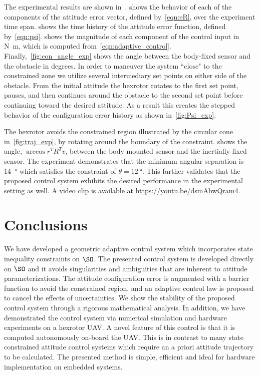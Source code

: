 The experimental results are shown in~.
 shows the behavior of each of the components of the attitude error vector, defined by~\cref{eqn:eR}, over the experiment time span.
 shows the time history of the attitude error function, defined by~\cref{eqn:psi}.
 shows the magnitude of each component of the control input in \si{\newton\meter}, which is computed from~\cref{eqn:adaptive_control}.
Finally,~\cref{fig:con_angle_exp} shows the angle between the body-fixed sensor and the obstacle in degrees.
In order to maneuver the system ``close" to the constrained zone we utilize several intermediary set points on either side of the obstacle.
From the initial attitude the hexrotor rotates to the first set point, pauses, and then continues around the obstacle to the second set point before continuing toward the desired attitude.
As a result this creates the stepped behavior of the configuration error history as shown in~\cref{fig:Psi_exp}.

The hexrotor avoids the constrained region illustrated by the circular cone in~\cref{fig:traj_exp}, by rotating around the boundary of the constraint. 
 shows the angle, \( \arccos r^T R^T v \), between the body mounted sensor and the inertially fixed sensor.
The experiment demonstrates that the minimum angular separation is \SI{14}{\degree} which satisfies the constraint of \( \theta = \SI{12}{\degree} \).
This further validates that the proposed control system exhibits the desired performance in the experimental setting as well. 
A video clip is available at \url{https://youtu.be/dsmAbwQram4}.

\section{Conclusions}\label{sec:conclusions}
We have developed a geometric adaptive control system which incorporates state inequality constraints on \(\SO\).
The presented control system is developed directly on \(\SO\) and it avoids singularities and ambiguities that are inherent to attitude parameterizations.
The attitude configuration error is augmented with a barrier function to avoid the constrained region, and an adaptive control law is proposed to cancel the effects of uncertainties. 
We show the stability of the  proposed control system through a rigorous mathematical analysis.
In addition, we have demonstrated the control system via numerical simulation and hardware experiments on a hexrotor UAV.
A novel feature of this control is that it is computed autonomously on-board the UAV.
This is in contrast to many state constrained attitude control systems which require an a priori attitude trajectory to be calculated. 
The presented method is simple, efficient and ideal for hardware implementation on embedded systems.

